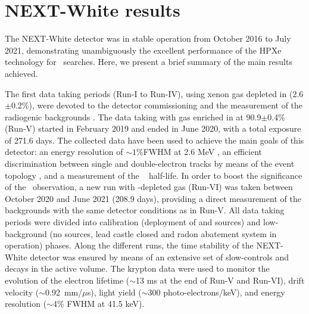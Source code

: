 \section{NEXT-White results}
\label{sec.new}


The NEXT-White detector \cite{NEXT:2018rgj} was in stable operation from October 2016 to July 2021, demonstrating unambiguously the excellent performance of the HPXe technology for \bbonu\ searches. Here, we present a brief summary of the main results achieved. 

The first data taking periods (Run-I to Run-IV), using xenon gas depleted in  (2.6$\pm$0.2\%), were devoted to the detector commissioning and the measurement of the radiogenic backgrounds \cite{NEXT:2018zho,Novella:2019cne}. The data taking with gas enriched in  at 90.9$\pm$0.4\% (Run-V) started in February 2019 and ended in June 2020, with a total exposure of 271.6 days. The collected data have been used to achieve the main goals of this detector: an energy resolution of $\sim1\%$FWHM at 2.6 MeV \cite{Renner:2019pfe}, an efficient discrimination between single and double-electron tracks by means of the event topology \cite{Ferrario:2019kwg,NEXT:2020jmz,NEXT:2021pjq}, and a measurement of the  \bbtnu~ half-life. In order to boost the significance of the \bbtnu ~observation, a new run with -depleted gas (Run-VI) was taken between October 2020 and June 2021 (208.9 days), providing a direct measurement of the backgrounds with the same detector conditions as in Run-V. All data taking periods were divided into calibration (deployment of  and  sources) and low-background (no sources, lead castle closed and radon abatement system in operation) phases. Along the different runs, the time stability of the NEXT-White detector was ensured by means of an extensive set of slow-controls and  decays in the active volume. The krypton data were used to monitor the evolution of the electron lifetime ($\sim$13 ms at the end of Run-V and Run-VI), drift velocity ($\sim$0.92~mm/$\mu$s), light yield ($\sim$300 photo-electrons/keV), and energy resolution ($\sim$4\% FWHM at 41.5 keV).      


